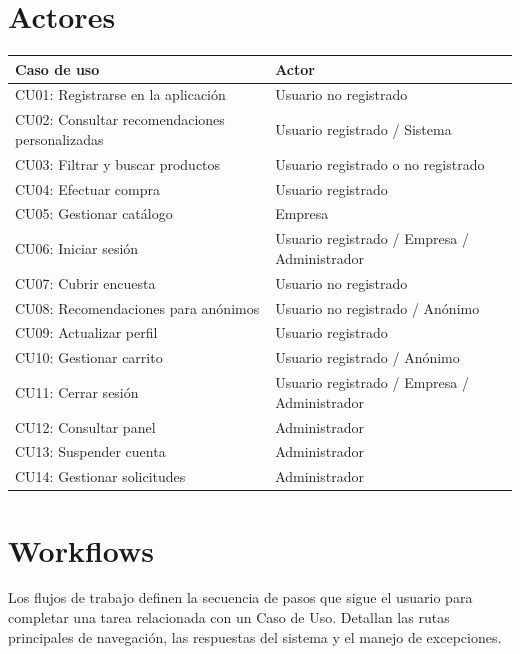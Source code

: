 \section{Actores}
\begin{longtable}{p{9cm}p{6cm}}
\hline\textbf{Caso de uso}&\textbf{Actor}\\\hline
CU01: Registrarse en la aplicación&Usuario no registrado\\
CU02: Consultar recomendaciones personalizadas&Usuario registrado / Sistema\\
CU03: Filtrar y buscar productos&Usuario registrado o no registrado\\
CU04: Efectuar compra&Usuario registrado\\
CU05: Gestionar catálogo&Empresa\\
CU06: Iniciar sesión&Usuario registrado / Empresa / Administrador\\
CU07: Cubrir encuesta&Usuario no registrado\\
CU08: Recomendaciones para anónimos&Usuario no registrado / Anónimo\\
CU09: Actualizar perfil&Usuario registrado\\
CU10: Gestionar carrito&Usuario registrado / Anónimo\\
CU11: Cerrar sesión&Usuario registrado / Empresa / Administrador\\
CU12: Consultar panel&Administrador\\
CU13: Suspender cuenta&Administrador\\
CU14: Gestionar solicitudes&Administrador\\
\hline
\end{longtable}

\section{Workflows}

Los flujos de trabajo definen la secuencia de pasos que sigue el usuario para completar una tarea relacionada con un Caso de Uso. Detallan las rutas principales de navegación, las respuestas del sistema y el manejo de excepciones.

